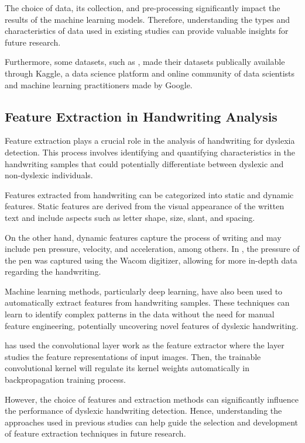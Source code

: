 The choice of data, its collection, and pre-processing significantly impact the results of the machine learning models. Therefore, understanding the types and characteristics of data used in existing studies can provide valuable insights for future research.

Furthermore, some datasets, such as \textcite{Isa2021CNNCM}, made their datasets publically available through Kaggle, a data science platform and online community of data scientists and machine learning practitioners made by Google.

\newpage
\subsection{Feature Extraction in Handwriting Analysis}
Feature extraction plays a crucial role in the analysis of handwriting for dyslexia detection. This process involves identifying and quantifying characteristics in the handwriting samples that could potentially differentiate between dyslexic and non-dyslexic individuals.

Features extracted from handwriting can be categorized into static and dynamic features. Static features are derived from the visual appearance of the written text and include aspects such as letter shape, size, slant, and spacing. 

On the other hand, dynamic features capture the process of writing and may include pen pressure, velocity, and acceleration, among others. In \parencite{Lam2011ChineseHP}, the pressure of the pen was captured using the Wacom digitizer, allowing for more in-depth data regarding the handwriting.

Machine learning methods, particularly deep learning, have also been used to automatically extract features from handwriting samples. These techniques can learn to identify complex patterns in the data without the need for manual feature engineering, potentially uncovering novel features of dyslexic handwriting. 

\textcite{Isa2021CNNCM} has used the convolutional layer work as the feature extractor where the layer studies the feature representations of input images. Then, the trainable convolutional kernel will regulate its kernel weights automatically in backpropagation training process.

However, the choice of features and extraction methods can significantly influence the performance of dyslexic handwriting detection. Hence, understanding the approaches used in previous studies can help guide the selection and development of feature extraction techniques in future research.


